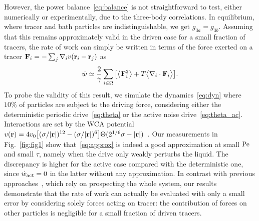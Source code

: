 \documentclass[superscriptaddress, twocolumn, prx, longbibliography, nofootinbib]{revtex4-1}
\begin{document}
However, the power balance~\eqref{eq:balance} is not straightforward to test, either numerically or experimentally, due to the three-body correlations. In equilibrium, where tracer and bath particles are indistinguishable, we get $g_{3a}=g_{3b}$. Assuming that this remains approximately valid in the driven case for a small fraction of tracers, the rate of work can simply be written in terms of the force exerted on a tracer ${\bf F}_i =- \sum_j\nabla_iv({\bf r}_i-{\bf r}_j)$ as
\begin{equation}\label{eq:approx}
	\dot w \simeq \frac{2}{\gamma}\sum_{i\in\Omega} \big[ \big\langle{\bf F}_i^2\big\rangle + T \big\langle\nabla_i\cdot{\bf F}_i\big\rangle \big] .
\end{equation}
To probe the validity of this result, we simulate the dynamics~\eqref{eq:dyn} where $10\%$ of particles are subject to the driving force, considering either the deterministic periodic drive~\eqref{eq:theta} or the active noise drive~\eqref{eq:theta_ac}. Interactions are set by the WCA potential $v({\bf r})=4v_0\big[(\sigma/|{\bf r}|)^{12}-(\sigma/|{\bf r}|)^6\big]\Theta(2^{1/6}\sigma-|{\bf r}|)$~\cite{WCA1971}. Our measurements in Fig.~\ref{fig:fig1} show that~\eqref{eq:approx} is indeed a good approximation at small $\rm Pe$ and small $\tau$, namely when the drive only weakly perturbs the liquid. The discrepancy is higher for the active case compared with the deterministic one, since $\dot w_{\rm act} = 0$ in the latter without any approximation. In contrast with previous approaches~\cite{Harada2005, Lander2012, Battle604}, which rely on prospecting the whole system, our results demonstrate that the rate of work can actually be evaluated with only a small error by considering solely forces acting on tracer: the contribution of forces on other particles is negligible for a small fraction of driven tracers.
\end{document}
